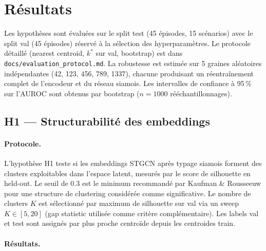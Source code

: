 
\section{Résultats}
\label{sec:results}

Les hypothèses sont évaluées sur le split test (45 épisodes, 15 scénarios) avec
le split val (45 épisodes) réservé à la sélection des hyperparamètres.
Le protocole détaillé (nearest centroid, $k^*$ sur val, bootstrap) est dans
\texttt{docs/evaluation\_protocol.md}.
La robustesse est estimée sur 5 graines aléatoires indépendantes (42, 123, 456, 789, 1337),
chacune produisant un réentraînement complet de l'encodeur et du réseau siamois.
Les intervalles de confiance à 95\,\% sur l'AUROC sont obtenus par bootstrap
($n = 1000$ rééchantillonnages).

\subsection{H1 --- Structurabilité des embeddings}
\label{sec:h1}

\paragraph{Protocole.}
L'hypothèse H1 teste si les embeddings STGCN après typage siamois forment des clusters
exploitables dans l'espace latent, mesurés par le score de silhouette en held-out.
Le seuil de 0.3 est le minimum recommandé par Kaufman \& Rousseeuw \cite{kaufman1990}
pour une structure de clustering considérée comme significative.
Le nombre de clusters $K$ est sélectionné par maximum de silhouette sur val via un
sweep $K \in [5, 20]$ (gap statistic \cite{tibshirani2001} utilisée comme critère complémentaire).
Les labels val et test sont assignés par plus proche centroïde depuis les centroides train.

\paragraph{Résultats.}

